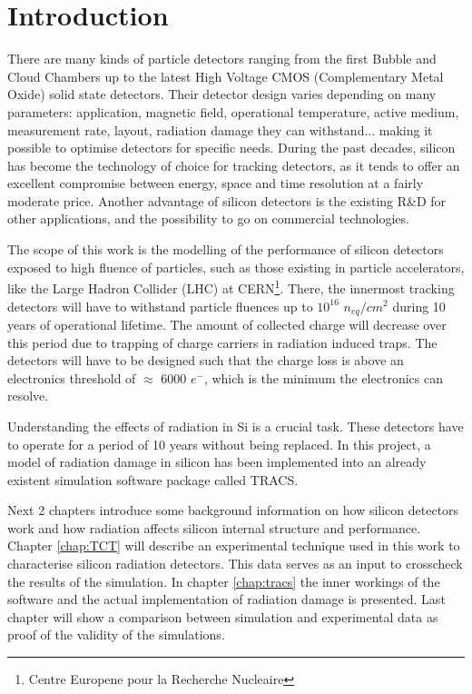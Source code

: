 \chapter{Introduction}

There are many kinds of particle detectors ranging from the first Bubble and Cloud Chambers up to the latest High Voltage CMOS (Complementary Metal Oxide) solid state detectors. Their detector design varies depending on many parameters: application, magnetic field, operational temperature, active medium, measurement rate, layout, radiation damage they can withstand... making it possible to optimise detectors for specific needs. During the past decades, silicon has become the technology of choice for tracking detectors, as it tends to offer an excellent compromise between energy, space and time resolution at a fairly moderate price. Another advantage of silicon detectors is the existing R\&D for other applications, and the possibility to go on commercial technologies.

 The scope of this work is the modelling of the performance of silicon detectors exposed to high fluence of particles, such as those existing in particle accelerators, like the Large Hadron Collider (LHC) at CERN\footnote{Centre Europene pour la Recherche Nucleaire}. There, the innermost tracking detectors will have to withstand particle fluences up to $10^{16}$ $n_{eq}/cm^{2}$  during 10 years of operational lifetime. The amount of collected charge will decrease over this period due to trapping of charge carriers in radiation induced traps. The detectors will have to be designed such that the charge loss is above an electronics threshold of $\approx$ 6000 $e^{-}$, which is the minimum the electronics can resolve. 

 Understanding the effects of radiation in Si is a crucial task. These detectors have to operate for a period of 10 years without being replaced. In this project, a model of radiation damage in silicon has been implemented into an already existent simulation software package called TRACS\cite{TRACS}. 
 
 Next 2 chapters introduce some background information on how silicon detectors work and how radiation affects silicon internal structure and performance. Chapter \ref{chap:TCT} will describe an experimental technique used in this work to characterise silicon radiation detectors. This data serves as an input to crosscheck the results of the simulation. In chapter \ref{chap:tracs} the inner workings of the software and the actual implementation of radiation damage is presented. Last chapter will show a comparison between simulation and experimental data as proof of the validity of the simulations. 

